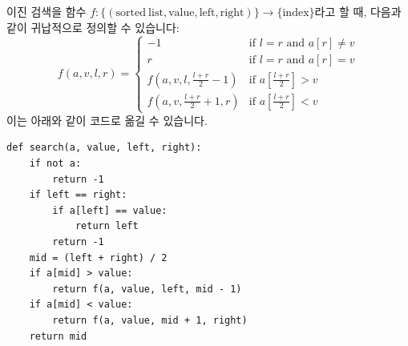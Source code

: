\documentclass[../main.tex]{subfiles}
\begin{document}
이진 검색을 함수 $f: \{(\mathrm{sorted\ list}, \mathrm{value}, \mathrm{left}, \mathrm{right})\} \rightarrow \{\mathrm{index}\}$라고 할 때, 다음과 같이 귀납적으로 정의할 수 있습니다:
\[
f(a, v, l, r) = \begin{cases}
-1 & \text{if } l = r \text{ and } a[r] \neq v\\
r & \text{if } l = r \text{ and } a[r] = v\\
f\left(a, v, l, \frac{l + r}{2} - 1\right) & \text{if } a\left[\frac{l + r}{2}\right] > v\\
f\left(a, v, \frac{l + r}{2} + 1, r\right) & \text{if } a\left[\frac{l + r}{2}\right] < v
\end{cases}
\]
이는 아래와 같이 코드로 옮길 수 있습니다.
\begin{verbatim}
def search(a, value, left, right):
    if not a:
        return -1
    if left == right:
        if a[left] == value:
            return left
        return -1
    mid = (left + right) / 2
    if a[mid] > value:
        return f(a, value, left, mid - 1)
    if a[mid] < value:
        return f(a, value, mid + 1, right)
    return mid
\end{verbatim}
\end{document}
